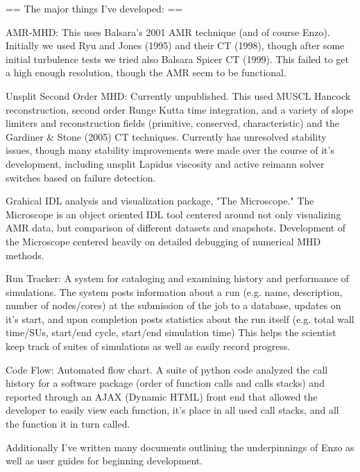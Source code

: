 \documentclass[10pt]{article}
\begin{document}
== The major things I've developed: ==

AMR-MHD:  This uses Balsara's 2001 AMR technique (and of course Enzo).
 Initially we used Ryu and Jones (1995) and their CT (1998), though
 after some initial turbulence tests we tried also Balsara Spicer CT
 (1999).  This failed to get a high enough resolution, though the AMR
 seem to be functional.

 Unsplit Second Order MHD: Currently unpublished.  This used MUSCL
 Hancock reconstruction, second order Runge Kutta time integration, and
 a variety of slope limiters and reconstruction fields (primitive,
 conserved, characteristic) and the Gardiner \& Stone (2005) CT
 techniques.  Currently has unresolved stability issues, though many
 stability improvements were made over the course of it's development,
 including unsplit Lapidus viscosity and active reimann solver switches
 based on failure detection.

 Grahical IDL analysis and visualization package, "The Microscope."
 The Microscope is an object oriented IDL tool centered around not only
 visualizing AMR data, but comparison of different datasets and
 snapshots.  Development of the Microscope centered heavily on detailed
 debugging of numerical MHD methods.

 Run Tracker: A system for cataloging and examining history and
 performance of simulations.  The system posts information about a run
 (e.g. name, description, number of nodes/cores) at the submission of
 the job to a database, updates on it's start, and upon completion
 posts statistics about the run itself (e.g. total wall time/SUs,
 start/end cycle, start/end simulation time) This helps the scientist
 keep track of suites of simulations as well as easily record progress.

 Code Flow: Automated flow chart.  A suite of python code analyzed the
 call history for a software package (order of function calls and calls
 stacks) and reported through an AJAX (Dynamic HTML) front end that
 allowed the developer to easily view each function, it's place in all
 used call stacks, and all the function it in turn called.

 Additionally I've written many documents outlining the underpinnings
 of Enzo as well as user guides for beginning development.
\end{document}
